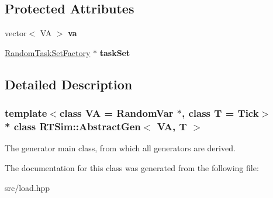\subsection*{Protected Attributes}
\begin{DoxyCompactItemize}
\item 
vector$<$ VA $>$ {\bfseries va}\hypertarget{classRTSim_1_1AbstractGen_a12b83e8a4ffd827738cd57d82ef8c88b}{}\label{classRTSim_1_1AbstractGen_a12b83e8a4ffd827738cd57d82ef8c88b}

\item 
\hyperlink{classRTSim_1_1RandomTaskSetFactory}{Random\+Task\+Set\+Factory} $\ast$ {\bfseries task\+Set}\hypertarget{classRTSim_1_1AbstractGen_a6b6db5eedb190702271c86968457141f}{}\label{classRTSim_1_1AbstractGen_a6b6db5eedb190702271c86968457141f}

\end{DoxyCompactItemize}


\subsection{Detailed Description}
\subsubsection*{template$<$class VA = Random\+Var $\ast$, class T = Tick$>$\\*
class R\+T\+Sim\+::\+Abstract\+Gen$<$ V\+A, T $>$}

The generator main class, from which all generators are derived. 

The documentation for this class was generated from the following file\+:\begin{DoxyCompactItemize}
\item 
src/load.\+hpp\end{DoxyCompactItemize}

